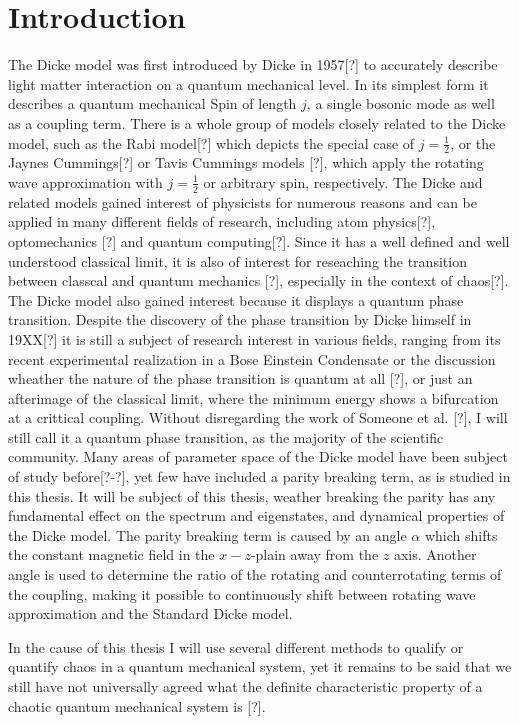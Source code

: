 \section{Introduction}
The Dicke model was first introduced by Dicke in 1957[?] to accurately describe light matter interaction on a quantum mechanical level. 
In its simplest form it describes a quantum mechanical Spin of length $j$, a single bosonic mode as well as a coupling term.
There is a whole group of models closely related to the Dicke model, such as the Rabi model[?] which depicts the special case of $j = \frac{1}{2}$, or the Jaynes Cummings[?] or Tavis Cummings models [?], which apply the rotating wave approximation with $j = \frac{1}{2}$ or arbitrary spin, respectively. 
The Dicke and related models gained interest of physicists for numerous reasons and can be applied in many different fields of research, including atom physics[?], optomechanics [?] and quantum computing[?]. 
Since it has a well defined and well understood classical limit, it is also of interest for reseaching the transition between classcal and quantum mechanics [?], especially in the context of chaos[?].
The Dicke model also gained interest because it displays a quantum phase transition.
Despite the discovery of the phase transition by Dicke himself in 19XX[?] it is still a subject of research interest in various fields, ranging from its recent experimental realization in a Bose Einstein Condensate or the discussion wheather the nature of the phase transition is quantum at all [?], or just an afterimage of the classical limit, where the minimum energy shows a bifurcation at a crittical coupling.
Without disregarding the work of Someone et al. [?], I will still call it a quantum phase transition, as the majority of the scientific community.
Many areas of parameter space of the Dicke model have been subject of study before[?-?], yet few have included a parity breaking term, as is studied in this thesis.
It will be subject of this thesis, weather breaking the parity has any fundamental effect on the spectrum and eigenstates, and dynamical properties of the Dicke model.
The parity breaking term is caused by an angle $\alpha$ which shifts the constant magnetic field in the $x-z$-plain away from the $z$ axis.
Another angle is used to determine the ratio of the rotating and counterrotating terms of the coupling, making it possible to continuously shift between rotating wave approximation and the Standard Dicke model.

In the cause of this thesis I will use several different methods to qualify or quantify chaos in a quantum mechanical system, yet it remains to be said that we still have not universally agreed what the definite characteristic property of a chaotic quantum mechanical system is [?].